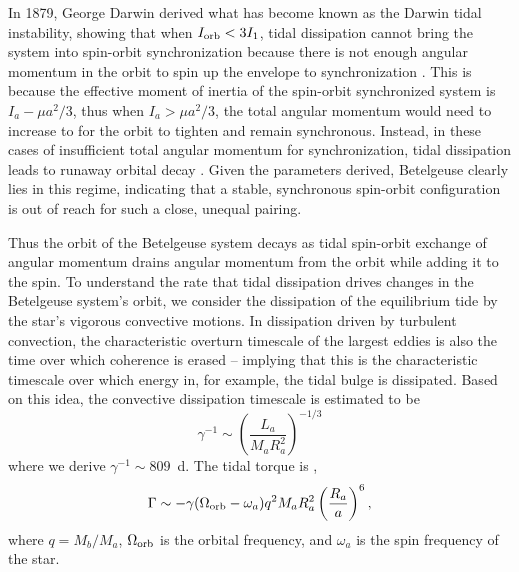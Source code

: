 \documentclass[twocolumn]{aastex631}
\begin{document}
In 1879, George Darwin derived what has become known as the Darwin tidal instability, showing that when $I_{\rm orb} < 3 I_1$, tidal dissipation cannot bring the system into spin-orbit synchronization because there is not enough angular momentum in the orbit to spin up the envelope to synchronization \citep{1879RSPS...29..168D,1880RSPT..171..713D,2014ARA&A..52..171O}. This is because the effective moment of inertia of the spin-orbit synchronized system is $I_a -\mu a^2 / 3$, thus when $I_a > \mu a^2 /3$, the total angular momentum would need to increase to for the orbit to tighten and remain synchronous.  Instead, in these cases of insufficient total angular momentum for synchronization, tidal dissipation leads to runaway orbital decay \citep{1879RSPS...29..168D,1980A&A....92..167H,2001ApJ...562.1012E,2006MNRAS.373..733S,2014ARA&A..52..171O}. Given the parameters derived, Betelgeuse clearly lies in this regime, indicating that a stable,  synchronous spin-orbit configuration is out of reach for such a close, unequal pairing. 





Thus the orbit of the Betelgeuse system decays as tidal spin-orbit exchange of angular momentum drains angular momentum from the orbit while adding it to the spin. To understand the rate that tidal dissipation drives changes in the Betelgeuse system's orbit, we consider the dissipation of the equilibrium tide by the star's vigorous convective motions. In dissipation driven by turbulent convection, the characteristic overturn timescale of the largest eddies is also the time over which coherence is erased -- implying that this is the characteristic timescale over which energy in, for example, the tidal bulge is dissipated. Based on this idea, the convective dissipation timescale is estimated \citep{1977A&A....57..383Z,1995A&A...296..709V,2020MNRAS.496.3767V,2023ApJ...956...27M} to be 
\begin{equation}
    \gamma^{-1} \sim \left( \frac{L_a}{M_a R_a^2} \right)^{-1/3}
\end{equation}
where we derive $\gamma^{-1} \sim 809$~d. 
The tidal torque is \citep{2008EAS....29...67Z},
\begin{equation}
    \Gamma \sim - \gamma (\Omega_{\rm orb} - \omega_a)q^2 M_a R_a^2 \left( \frac{R_a}{a} \right)^{6},
\end{equation}
where $q=M_b/M_a$, $\Omega_{\rm orb}$ is the orbital frequency, and $\omega_a$ is the spin frequency of the star. 
\end{document}
